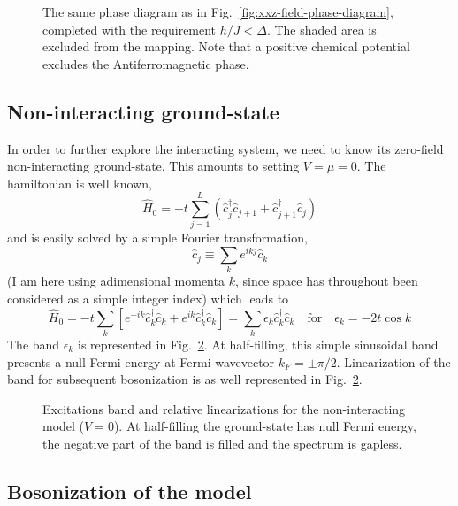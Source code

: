 \begin{figure}
	\centering
	
	\caption{The same phase diagram as in Fig.~\ref{fig:xxz-field-phase-diagram}, completed with the requirement $h/J < \Delta$. The shaded area is excluded from the mapping. Note that a positive chemical potential excludes the Antiferromagnetic phase.}
	\label{fig:jordan-wigner-phase-diagram}
\end{figure}

\subsection{Non-interacting ground-state}

In order to further explore the interacting system, we need to know its zero-field non-interacting ground-state. This amounts to setting $V=\mu=0$. The hamiltonian is well known,
\[
	\hat H_0 = -t \sum_{j=1}^{L} \left(
		\hat c_j^\dagger \hat c_{j+1} + \hat c_{j+1}^\dagger \hat c_j
	\right)
\]
and is easily solved by a simple Fourier transformation,
\[
	\hat c_j \equiv \sum_k e^{ikj} \hat c_k
\]
(I am here using adimensional momenta $k$, since space has throughout been considered as a simple integer index) which leads to
\begin{equation}\label{eq:XY-hamiltonian}
	\hat H_0 = -t \sum_k \left[
		e^{-ik} \hat c_k^\dagger \hat c_k + e^{ik} \hat c_k^\dagger \hat c_k
	\right] = \sum_k \epsilon_k \hat c_k^\dagger \hat c_k
	\quad\text{for}\quad
	\epsilon_k = -2t \cos k
\end{equation}
The band $\epsilon_k$ is represented in Fig.~\ref{fig:XY-band}. At half-filling, this simple sinusoidal band presents a null Fermi energy at Fermi wavevector $k_F = \pm \pi/2$. Linearization of the band for subsequent bosonization is as well represented in Fig.~\ref{fig:XY-band}.

\begin{figure}
	\centering
	
	\caption{Excitations band and relative linearizations for the non-interacting model ($V=0$). At half-filling the ground-state has null Fermi energy, the negative part of the band is filled and the spectrum is gapless.}
	\label{fig:XY-band}
\end{figure}

\subsection{Bosonization of the model}

